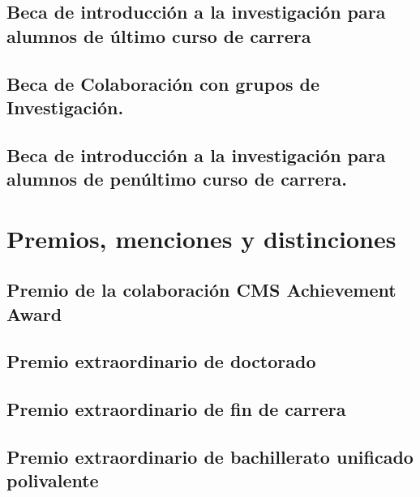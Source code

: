 \documentclass[a4paper, 11pt, twoside, openright]{report}
\begin{document}
\subsection{Beca de introducción a la investigación para alumnos de último curso de carrera}

\subsection{Beca de Colaboración con grupos de Investigación.}

\subsection{Beca de introducción a la investigación para alumnos de penúltimo curso de carrera.}



\section{Premios, menciones y distinciones}
\subsection{Premio de la colaboración CMS Achievement Award}

\subsection{Premio extraordinario de doctorado}

\subsection{Premio extraordinario de fin de carrera}

\subsection{Premio extraordinario de bachillerato unificado polivalente}

\end{document}
